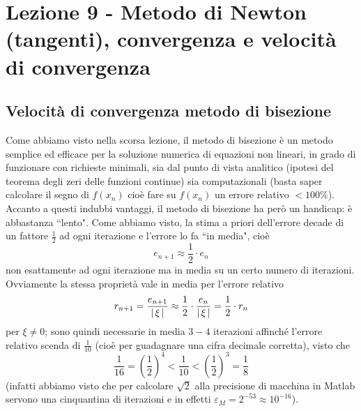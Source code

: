 \documentclass[12pt]{article}
\DeclarePairedDelimiter{\abs}{\lvert}{\rvert}
\begin{document}
\section[Lezione 9 - Metodo di Newton]{Lezione 9 - Metodo di Newton (tangenti), convergenza e velocità di convergenza}
\subsection{Velocità di convergenza metodo di bisezione}
Come abbiamo visto nella scorsa lezione, il metodo di bisezione è un metodo semplice ed efficace per la soluzione numerica di equazioni non lineari, in grado di funzionare con richieste minimali, sia dal punto di vista analitico (ipotesi del teorema degli zeri delle funzioni continue) sia computazionali (basta saper calcolare il segno di $f(x_n)$ cioè fare su $f(x_n)$ un errore relativo $<100\%$).\\
Accanto a questi indubbi vantaggi, il metodo di bisezione ha però un handicap: è abbastanza ``lento". Come abbiamo visto, la stima a priori dell'errore decade di un fattore $\frac{1}{2}$ ad ogni iterazione e l'errore lo fa ``in media", cioè 
\[ e_{n+1} \approx \frac{1}{2} \cdot e_n \]
non esattamente ad ogni iterazione ma in media su un certo numero di iterazioni.\\
Ovviamente la stessa proprietà vale in media per l'errore relativo
\[ r_{n+1}=\frac{e_{n+1}}{\abs{\,\xi\,}} \approx \frac{1}{2} \cdot \frac{e_n}{\abs{\,\xi\,}} = \frac{1}{2} \cdot r_n \]
per $\xi \ne 0$; sono quindi necessarie in media $3-4$ iterazioni affinché l'errore relativo scenda di $\frac{1}{10}$ (cioè per guadagnare una cifra decimale corretta), visto che 
\[\frac{1}{16} = \left(\frac{1}{2}\right)^4 < \frac{1}{10} < \left(\frac{1}{2}\right)^3 = \frac{1}{8}\] 
(infatti abbiamo visto che per calcolare $\sqrt{2}$ alla precisione di macchina in Matlab servono una cinquantina di iterazioni e in effetti $\varepsilon_M = 2^{-53} \approx 10^{-16}$).
\end{document}
